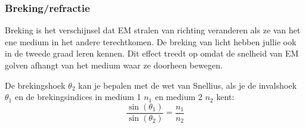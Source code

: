 


\subsubsection{Breking/refractie}
Breking is het verschijnsel dat EM stralen van richting veranderen als ze van het ene medium in het andere terechtkomen. De breking van licht hebben jullie ook in de tweede graad leren kennen. Dit effect treedt op omdat de snelheid van EM golven afhangt van het medium waar ze doorheen bewegen.


De brekingshoek $\theta_2$ kan je bepalen met de wet van Snellius, als je de invalshoek $\theta_1$ en de brekingsindices in medium 1 $n_1$ en medium 2 $n_2$ kent:
\begin{equation*}
    \frac{\sin(\theta_1)}{\sin(\theta_2)} = \frac{n_1}{n_2}
\end{equation*}

